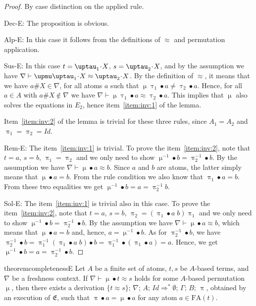\documentclass{llncs}
\newcommand{\Lra}{\Longrightarrow}
\newcommand{\idp}{\mathit{Id}}
\newcommand{\perm}{\approx}
\newcommand{\permap}{{\mkern 1mu\cdot \mkern 1mu}}
\newcommand{\permef}{\bullet}
\newcommand\ppi{\uppi}
\newcommand\ptau{\uptau}
\newcommand\pmu{\upmu}
\newcommand{\msys}{\mathfrak{E}}
\newcommand{\mproblem}{E}
\newcommand{\Atoms}{A}
\newcommand{\nablai}{{\nabla}}
\newcommand{\nablag}{\Gamma}
\newcommand{\fatom}{\mathrm{FA}}
\begin{document}
\begin{proof} 
  By case distinction on the applied rule.

  {\sf Dec-E}: The proposition is obvious.

  {\sf Alp-E}: In this case it follows from the definitions of
  $\approx$ and permutation application.

  {\sf Sus-E}: In this case $t=\ptau_1\permap X$, $s=\ptau_2\permap
  X$, and by the assumption we have $\nabla \vdash \pmu \ptau_1\permap
  X \approx \ptau_2\permap X $. By the definition of $\approx$, it
  means that we have $a\#X\in\nabla$, for all atoms $a$ such that
  $\pmu \ptau_1 \permef a \neq \ptau_2 \permef a$. Hence, for all
  $a\in\Atoms$ with $a\#X\notin\nabla$ we have $\nabla \vdash \pmu
  \ptau_1 \permef a \approx \ptau_2 \permef a$. This implies that
  $\pmu$ also solves the equations in $\mproblem_2$, hence
  item~\ref{item:inv:1} of the lemma.

  Item~\ref{item:inv:2} of the lemma is trivial for these three
  rules, since $A_1=A_2$ and $\ppi_1=\ppi_2=\idp$.

  {\sf Rem-E}: The item~\ref{item:inv:1} is trivial. To prove the
  item~\ref{item:inv:2}, note that $t=a$, $s= b$, $\ppi_1=\ppi_2$ and
  we only need to show $\pmu^{-1}\permef b = \ppi_2^{-1} \permef
  b$. By the assumption we have $\nabla \vdash \pmu \permef a
  \approx b $. Since $a$ and $b$ are atoms, the latter simply means
  that $\pmu\permef a = b$. From the rule condition we also know that
  $\ppi_1\permef a = b$. From these two equalities we get $\pmu^{-1}
  \permef b = a = \ppi_2^{-1} b$.

  {\sf Sol-E}: The item~\ref{item:inv:1} is trivial also in this case.
  To prove the item~\ref{item:inv:2}, note that $t=a$, $s= b$,
  $\ppi_2=(\ppi_1\permef a\; b) \ppi_1$ and we only need to show
  $\pmu^{-1}\permef b = \ppi_2^{-1} \permef b$. By the assumption we
  have $\nabla \vdash \pmu \permef a \approx b $, which means that
  $\pmu \permef a = b$ and, hence, $a = \pmu^{-1}\permef b$. As for
  $\ppi_2^{-1}\permef b$, we have $\ppi_2^{-1} \permef b =
  \ppi_1^{-1}(\ppi_1\permef a\;b) \permef b =
  \ppi_1^{-1} \permef (\ppi_1\permef a) = a$. Hence, we get $\pmu^{-1}\permef b = a = \ppi_2^{-1}\permef b$.
\end{proof}



\begin{restatable}[Completeness of $\msys$]{theorem}{completenessE}
\label{thm:completeness:equiv}
   Let $\Atoms$ be a finite set of atoms, $t,s$ be $\Atoms$-based
   terms, and $\nabla$ be a freshness context. If
   $\nablai\vdash \pmu \permef t\approx s$ holds for some
   $\Atoms$-based permutation $\pmu$, then there exists a derivation $
   \{t\perm s\} ;\,\allowbreak \nablai ;\,\allowbreak
   \Atoms;\,\allowbreak \idp \Lra^* \emptyset ;\, \nablag;\, B ;\,
   \ppi $, obtained by an execution of $\msys$, such that $\ppi\permef
   a = \pmu\permef a$ for any atom $a\in\fatom(t)$.
\end{restatable}
\end{document}
